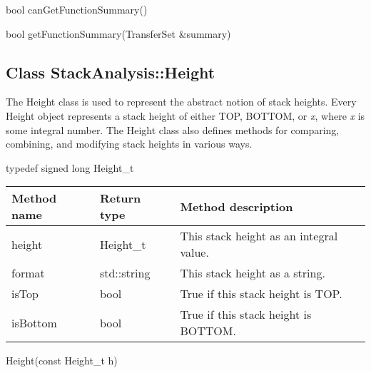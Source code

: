 \begin{apient}
	bool canGetFunctionSummary()
\end{apient}

\begin{apient}
	bool getFunctionSummary(TransferSet &summary)
\end{apient}




\subsection{Class StackAnalysis::Height}

The Height class is used to represent the abstract notion of stack heights.  Every Height object represents a stack height of either TOP, BOTTOM, or \emph{x}, where \emph{x} is some integral number.  The Height class also defines methods for comparing, combining, and modifying stack heights in various ways.

\begin{apient}
typedef signed long Height_t
\end{apient}

\begin{tabular}{p{1.25in}p{1.125in}p{3.125in}}
	\toprule
	Method name & Return type & Method description \\
	\midrule
	height & Height\_t & This stack height as an integral value.\\
	format & std::string & This stack height as a string.\\
	isTop & bool & True if this stack height is TOP.\\
	isBottom & bool & True if this stack height is BOTTOM.\\
	\bottomrule
\end{tabular}

\begin{apient}
Height(const Height_t h)
\end{apient}

